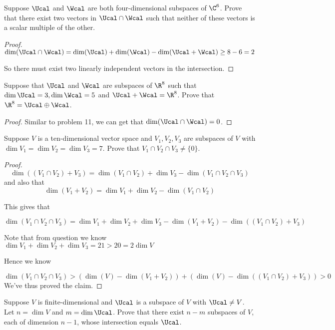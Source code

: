 \documentclass{extarticle}
\begin{document}
\begin{problem}{11}
    Suppose \(\Ucal\) and \(\Wcal\) are both four-dimensional subspaces of \(\C^6\). Prove that 
    there exist two vectors in \(\Ucal \cap \Wcal\) such that neither of these vectors is a 
    scalar multiple of the other. 
\end{problem}

\begin{proof}
\(\dim (\Ucal \cap \Wcal) = \dim(\Ucal) + \dim (\Wcal) - \dim(\Ucal + \Wcal) \geq 8-6= 2\)

So there must exist two linearly independent vectors in the intersection. 
\end{proof}

\begin{problem}{12}
    Suppose that \(\Ucal\) and \(\Wcal\) are subspaces of \(\R^8\) such that 
    \(\dim \Ucal = 3, \dim \Wcal = 5\) and \(\Ucal + \Wcal = \R^8\). Prove that 
    \(\R^8 = \Ucal \oplus \Wcal\).
\end{problem}

\begin{proof}
Similar to problem 11, we can get that \(\dim (\Ucal \cap \Wcal) = 0\). 
\end{proof}

\begin{problem}{14}
    Suppose \(V\) is a ten-dimensional vector space and \(V_1, V_2, V_3\) are subspaces 
    of \(V\) with \(\dim V_1 = \dim V_2 = \dim V_3 = 7\). Prove that \(V_1 \cap V_2 
    \cap V_3 \neq \{0\}\). 
\end{problem}

\begin{proof}
\[\dim ((V_1 \cap V_2) + V_3) = \dim (V_1 \cap V_2) + \dim V_3 - \dim (V_1 \cap V_2 \cap V_3) \]
and also that 
\[\dim (V_1 + V_2) = \dim V_1 + \dim V_2 - \dim(V_1 \cap V_2)\]

This gives that 

\[\dim (V_1 \cap V_2 \cap V_3) = \dim V_1 + \dim V_2 + \dim V_3 - \dim (V_1 + V_2) - 
\dim ((V_1 \cap V_2) + V_3)\]

Note that from question we know \(\dim V_1 + \dim V_2 + \dim V_3 = 21 > 20 = 2\dim V\)

Hence we know 

\[\dim (V_1 \cap V_2 \cap V_3) > (\dim(V) - \dim(V_1 + V_2)) + (\dim(V) - \dim(
    (V_1 \cap V_2) + V_3
)) > 0\]
We've thus proved the claim.
\end{proof}

\begin{problem}{16}
    Suppose \(V\) is finite-dimensional and \(\Ucal\) is a subspace of \(V\)
    with \(\Ucal \neq V\). Let \(n = \dim V\) and \(m = \dim \Ucal\). Prove that 
    there exist \(n - m\) subspaces of \(V\), each of dimension \(n -1\), whose 
    intersection equals \(\Ucal\). 
\end{problem}
\end{document}
